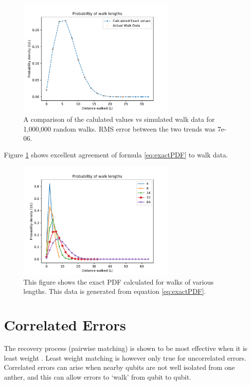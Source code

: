 \begin{figure}
\centering
\includegraphics[width = 0.7\textwidth]{figs/calculatedvssimulated.pdf}
\caption{A comparison of the calulated values vs simulated walk data for 1,000,000 random walks. RMS error between the two trends was 7e-06. }
\label{fig:exactproof}
\end{figure}
Figure \ref{fig:exactproof} shows excellent agreement of formula \ref{eq:exactPDF} to walk data. 



\begin{figure}
\centering
\includegraphics[width = 0.7\textwidth]{figs/exactPDF.pdf}
\caption{This figure shows the exact PDF calculated for walks of various lengths. This data is generated from equation \ref{eq:exactPDF}.}
\end{figure}







\section{Correlated Errors}
	The recovery process (pairwise matching) is shown to be most effective when it is least weight \cite{Dennis2001}. Least weight matching is however only true for uncorrelated errors.
	Correlated errors can arise when nearby qubits are not well isolated from one anther, and this can allow errors to `walk' from qubit to qubit.

